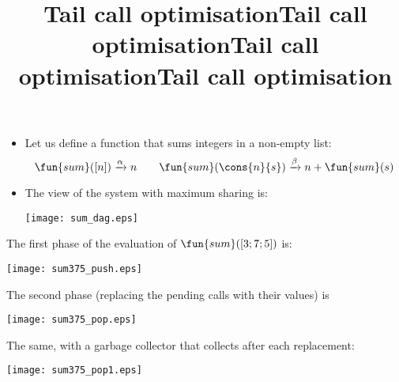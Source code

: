 \documentclass[wide]{slides}
\begin{document}
\begin{slide}
  \title{Tail call optimisation}

  \begin{itemize}

    \item Let us define a function that sums integers in a
      non\hyp{}empty list:
      \begin{equation*}
        \fun{sum}([n]) \xrightarrow{\alpha} n\qquad
        \fun{sum}(\cons{n}{s}) \xrightarrow{\beta} n + \fun{sum}(s)
      \end{equation*}

    \item The view of the system with maximum sharing is:
      \begin{center}
        \texttt{[image: sum\_dag.eps]}
      \end{center}

  \end{itemize}

\end{slide}

\begin{slide}
  \title{Tail call optimisation}

  The first phase of the evaluation of \(\fun{sum}([3;7;5])\) is:
  \begin{center}
    \texttt{[image: sum375\_push.eps]}
  \end{center}

\end{slide}

\begin{slide}
  \title{Tail call optimisation}

  The second phase (replacing the pending calls with their values) is
  \begin{center}
    \texttt{[image: sum375\_pop.eps]}
  \end{center}

\end{slide}

\begin{slide}
  \title{Tail call optimisation}

  The same, with a garbage collector that collects after each
  replacement:
  \begin{center}
    \texttt{[image: sum375\_pop1.eps]}
  \end{center}

\end{slide}
\end{document}
